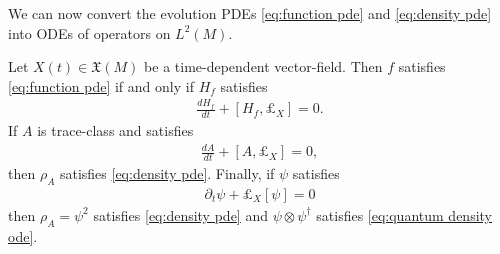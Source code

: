 \documentclass[final,leqno]{siamart}
\newcommand{\pder}[2]{\ensuremath{\frac{ \partial #1}{\partial #2}}}
\newtheorem{example}[theorem]{Example}
\begin{document}
%

We can now convert the evolution PDEs \eqref{eq:function pde} and \eqref{eq:density pde} into ODEs of operators on $L^{2}(M)$.

\begin{theorem} \label{thm:quantize}
	Let $X(t) \in \mathfrak{X}(M)$ be a time-dependent vector-field.
	Then $f$ satisfies \eqref{eq:function pde}
	if and only if $H_{f}$ satisfies
	\begin{align}
		\frac{d H_{f} }{dt} + [ H_{f} , \pounds_{X} ] = 0. \label{eq:quantum observable ode}
	\end{align}
	If $A$ is trace-class and satisfies
	\begin{align}
		\frac{dA}{dt} + [ A , \pounds_{X} ] = 0, \label{eq:quantum density ode}
	\end{align}
	then $\rho_{A}$ satisfies \eqref{eq:density pde}.
	Finally, if $\psi$ satisfies
	\begin{align}
		\partial_t \psi + \pounds_X[\psi] = 0 \label{eq:half density pde}
	\end{align}
	then $\rho_{A} = \psi^{2}$ satisfies \eqref{eq:density pde} and $\psi \otimes \psi^{\dagger}$ satisfies \eqref{eq:quantum density ode}.
\end{theorem}
\end{document}
